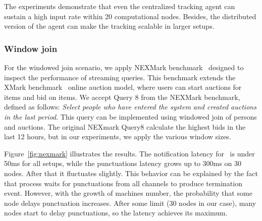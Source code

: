 The experiments demonstrate that even the centralized tracking agent can sustain a high input rate within 20 computational nodes. Besides, the distributed version of the agent can make the tracking scalable in larger setups.

\subsubsection{Window join}
For the windowed join scenario, we apply NEXMark benchmark~\cite{tucker2008nexmark} designed to inspect the performance of streaming queries. This benchmark extends the XMark benchmark~\cite{schmidt2002xmark} online auction model, where users can start auctions for items and bid on items. We accept Query 8 from the NEXMark benchmark, defined as follows: {\em Select people who have entered the system and created auctions in the last period}. This query can be implemented using windowed join of persons and auctions. The original NEXmark Query8 calculate the highest bids in the last 12 hours, but in our experiments, we apply the various window sizes.


Figure~\ref{fig:nexmark} illustrates the results. The notification latency for \tracker\ is under 50ms for all setups, while the punctuations latency grows up to 300ms on 30 nodes. After that it fluctuates slightly. This behavior can be explained by the fact that process waits for punctuations from all channels to produce termination event. However, with the growth of machines number, the probability that some node delays punctuation increases. After some limit (30 nodes in our case), many nodes start to delay punctuations, so the latency achieves its maximum. 

